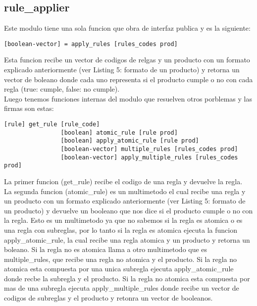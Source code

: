 \documentclass[a4paper, 12pt]{article}
\begin{document}
		\newpage
		\subsection{rule\_applier}
			Este modulo tiene una sola funcion que obra de interfaz publica y es la siguiente:
			\begin{lstlisting}[frame=tb, caption=firmas de la interfaz publica, label=zebra, tabsize=1]
				[boolean-vector] = apply_rules [rules_codes prod]
			\end{lstlisting}
			Esta funcion recibe un vector de codigos de relgas y un producto con un formato explicado anteriormente 
			(ver Listing 5: formato de un producto) y retorna un vector de boleano donde cada uno representa si el producto cumple 				o no con cada regla (true: cumple, false: no cumple).\\
			
			Luego tenemos funciones internas del modulo que resuelven otros porblemas y las firmas son estas:
			\begin{lstlisting}[frame=tb, caption=firmas de las funciones privadas, label=zebra, tabsize=1]
				[rule] get_rule [rule_code]
				[boolean] atomic_rule [rule prod]
				[boolean] apply_atomic_rule [rule prod]
				[boolean-vector] multiple_rules [rules_codes prod]
				[boolean-vector] apply_multiple_rules [rules_codes prod]
			\end{lstlisting}
			La primer funcion (get\_rule) recibe el codigo de una regla y devuelve la regla.\\
			La segunda funcion (atomic\_rule) es un multimetodo el cual recibe una regla y un producto con un formato explicado 				anteriormente (ver Listing 5: formato de un producto) y devuelve un booleano que nos dice si el producto cumple o no 				con la regla. Esto es un multimetodo ya que no sabemos si la regla es atomica o es una regla con subreglas, por lo tanto
			si la regla es atomica ejecuta la funcion apply\_atomic\_rule, la cual recibe una regla atomica y un producto y retorna 			un boleano. Si la regla no es atomica llama a otro multimetodo que es multiple\_rules, que recibe una regla no atomica 				y el producto. Si la regla no atomica esta compuesta por una unica subregla ejecuta apply\_atomic\_rule donde recbe la 				subregla y el producto. Si la regla no atomica esta compuesta por mas de una subregla ejecuta apply\_multiple\_rules 				donde recibe un vector de codigos de subreglas y el producto y retonra un vector de booleanos.

		\newpage
\end{document}
